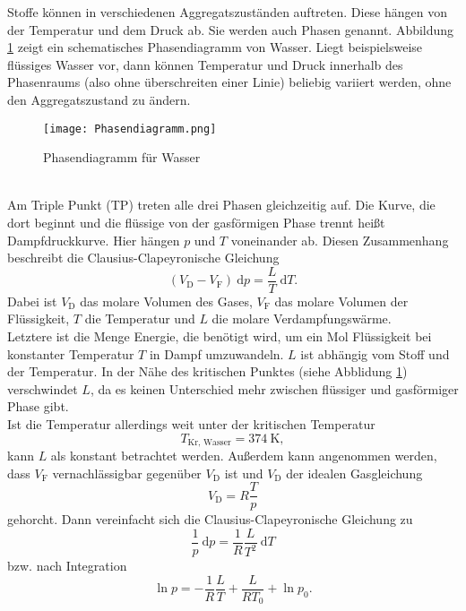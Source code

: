 Stoffe können in verschiedenen Aggregatszuständen auftreten. Diese hängen von der Temperatur und dem Druck ab. Sie werden auch Phasen genannt. Abbildung \ref{Phasendiagramm} zeigt ein schematisches Phasendiagramm von Wasser. Liegt beispielsweise flüssiges Wasser vor, dann können Temperatur und Druck innerhalb des Phasenraums (also ohne überschreiten einer Linie) beliebig variiert werden, ohne den Aggregatszustand zu ändern.
\begin{figure}[ht!]
	\centering
	\texttt{[image: Phasendiagramm.png]}
	\caption{Phasendiagramm für Wasser\cite{V203}}
	\label{Phasendiagramm}
\end{figure} \\
Am Triple Punkt (TP) treten alle drei Phasen gleichzeitig auf. Die Kurve, die dort beginnt und die flüssige von der gasförmigen Phase trennt heißt Dampfdruckkurve. Hier hängen $p$ und $T$ voneinander ab. Diesen Zusammenhang beschreibt die Clausius-Clapeyronische Gleichung
\begin{equation}\label{Clausius}
	(V_\text{D}-V_\text{F})\ \text{d}p = \frac{L}{T}\ \text{d}T.
\end{equation}
Dabei ist $V_\text{D}$ das molare Volumen des Gases, $V_\text{F}$ das molare Volumen der Flüssigkeit, $T$ die Temperatur und $L$ die molare Verdampfungswärme. \\
Letztere ist die Menge Energie, die benötigt wird, um ein Mol Flüssigkeit bei konstanter Temperatur $T$ in Dampf umzuwandeln. $L$ ist abhängig vom Stoff und der Temperatur. In der Nähe des kritischen Punktes (siehe Abblidung \ref{Phasendiagramm}) verschwindet $L$, da es keinen Unterschied mehr zwischen flüssiger und gasförmiger Phase gibt. \\
Ist die Temperatur allerdings weit unter der kritischen Temperatur \[T_\text{Kr, Wasser} = \SI{374}{\kelvin},\] kann $L$ als konstant betrachtet werden. Außerdem kann angenommen werden, dass $V_\text{F}$ vernachlässigbar gegenüber $V_\text{D}$ ist und $V_\text{D}$ der idealen Gasgleichung
\begin{equation}\label{ideales Gas}
	V_\text{D} = R\frac{T}{p}
\end{equation}
gehorcht. Dann vereinfacht sich die Clausius-Clapeyronische Gleichung zu
\begin{equation}\label{Clausius einfach}
	\frac{1}{p}\ \text{d}p = \frac{1}{R}\frac{L}{T^2}\ \text{d}T
\end{equation}
bzw. nach Integration
\begin{equation}\label{Regression ln(p)=1/T}
	\ln p = - \frac{1}{R}\frac{L}{T} + \frac{L}{RT_0}+\ln p_0.
\end{equation}